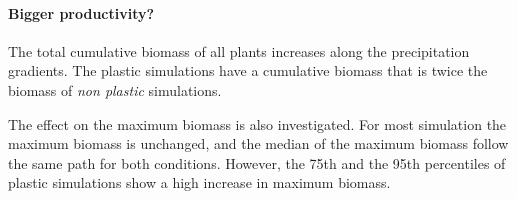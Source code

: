 \paragraph{Bigger productivity?}

The total cumulative biomass of all plants increases along the precipitation gradients. The plastic simulations have a cumulative biomass that is twice the biomass of \textit{non plastic} simulations.


\begin{figure}\label{fig:total_BM}
    \classiccaptionstyle
{}
\end{figure}

The effect on the maximum biomass is also investigated. For most simulation the maximum biomass is unchanged, and the median of the maximum biomass follow the same path for both conditions. However, the 75th and the 95th percentiles of plastic simulations show a high increase in maximum biomass.

